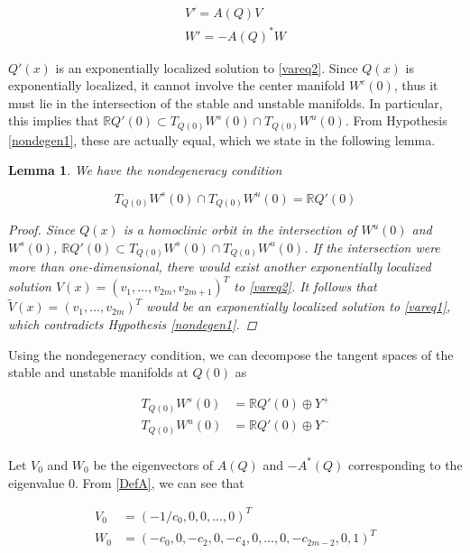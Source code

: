\documentclass[12pt]{article}
\def\R{{\mathbb R}}
\newtheorem{lemma}{Lemma}
\begin{document}
\begin{align}
V' = A(Q) V \label{vareq2} \\
W' = -A(Q)^* W \label{adjvareq2}
\end{align}

$Q'(x)$ is an exponentially localized solution to \eqref{vareq2}. Since $Q(x)$ is exponentially localized, it cannot involve the center manifold $W^c(0)$, thus it must lie in the intersection of the stable and unstable manifolds. In particular, this implies that $\R Q'(0) \subset T_{Q(0)}W^s(0) \cap T_{Q(0)}W^u(0)$. From Hypothesis \ref{nondegen1}, these are actually equal, which we state in the following lemma.

\begin{lemma}\label{nondegenlemma}
We have the nondegeneracy condition

\begin{equation}\label{nondegen2}
T_{Q(0)}W^s(0) \cap T_{Q(0)}W^u(0) = \R Q'(0)
\end{equation}

\begin{proof}
Since $Q(x)$ is a homoclinic orbit in the intersection of $W^u(0)$ and $W^s(0)$, $\R Q'(0) \subset T_{Q(0)}W^s(0) \cap T_{Q(0)}W^u(0)$. If the intersection were more than one-dimensional, there would exist another exponentially localized solution $V(x) = (v_1, \dots, v_{2m}, v_{2m+1})^T$ to \eqref{vareq2}. It follows that $\tilde{V}(x) = (v_1, \dots, v_{2m})^T$ would be an exponentially localized solution to \eqref{vareq1}, which contradicts Hypothesis \ref{nondegen1}.
\end{proof}
\end{lemma}

Using the nondegeneracy condition, we can decompose the tangent spaces of the stable and unstable manifolds at $Q(0)$ as

\begin{align*}
T_{Q(0)}W^s(0) &= \R Q'(0) \oplus Y^+ \\
T_{Q(0)}W^u(0) &= \R Q'(0) \oplus Y^- \\
\end{align*}

Let $V_0$ and $W_0$ be the eigenvectors of $A(Q)$ and $-A^*(Q)$ corresponding to the eigenvalue 0. From \eqref{DefA}, we can see that

\begin{align}
V_0 &= (-1/c_0, 0, 0, \dots, 0)^T \label{V0} \\
W_0 &= (-c_0, 0, -c_2, 0, -c_4, 0, \dots, 0, -c_{2m-2}, 0, 1)^T \label{W0}
\end{align}
\end{document}
